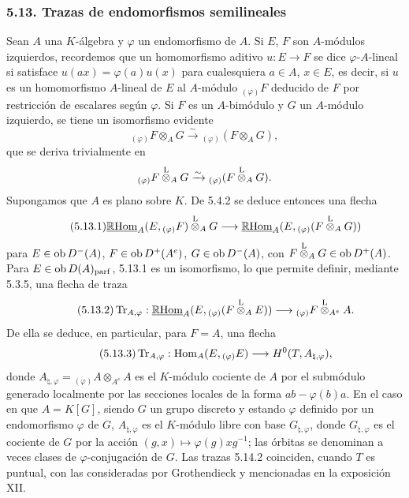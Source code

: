 \subsubsection*{5.13. Trazas de endomorfismos semilineales}

Sean $A$ una $K$-álgebra y $\varphi$ un endomorfismo de $A$. Si $E$, $F$ son $A$-módulos izquierdos, recordemos que un homomorfismo aditivo $u:E\to F$ se dice $\varphi$-$A$-lineal si satisface $u(ax)=\varphi(a)u(x)$ para cualesquiera $a\in A$, $x\in E$, es decir, si $u$ es un homomorfismo $A$-lineal de $E$ al $A$-módulo ${}_{(\varphi)}F$ deducido de $F$ por restricción de escalares según $\varphi$. Si $F$ es un $A$-bimódulo y $G$ un $A$-módulo izquierdo, se tiene un isomorfismo evidente
\[
{}_{(\varphi)}F\otimes_AG\xrightarrow{\sim}{}_{(\varphi)}(F\otimes_AG),
\]
que se deriva trivialmente en
\[
{}_{(\varphi)}F\overset{\mathrm L}{\otimes}_AG\xrightarrow{\sim}{}_{(\varphi)}(F\overset{\mathrm L}{\otimes}_AG).
\]
Supongamos que $A$ es plano sobre $K$. De 5.4.2 se deduce entonces una flecha
\begin{equation}\tag{5.13.1}
\underline{\mathbb{R}\mathrm{Hom}}_A(E,{}_{(\varphi)}F)\overset{\mathrm L}{\otimes}_AG\longrightarrow\underline{\mathbb{R}\mathrm{Hom}}_A(E,{}_{(\varphi)}(F\overset{\mathrm L}{\otimes}_AG))
\end{equation}
para $E\in\operatorname{ob} D^-(A)$, $F\in\operatorname{ob} D^+(A^e)$, $G\in\operatorname{ob} D^-(A)$, con $F\overset{\mathrm L}{\otimes}_AG\in\operatorname{ob} D^+(A)$. Para $E\in\operatorname{ob} D(A)_{\mathrm{parf}}$, 5.13.1 es un isomorfismo, lo que permite definir, mediante 5.3.5, una flecha de traza
\begin{equation}\tag{5.13.2}
\operatorname{Tr}_{A,\varphi}:\underline{\mathbb{R}\mathrm{Hom}}_A(E,{}_{(\varphi)}(F\overset{\mathrm L}{\otimes}_AE))\longrightarrow {}_{(\varphi)}F\overset{\mathrm L}{\otimes}_{A^e}A.
\end{equation}
De ella se deduce, en particular, para $F=A$, una flecha
\begin{equation}\tag{5.13.3}
\operatorname{Tr}_{A,\varphi}:\operatorname{Hom}_A(E,{}_{(\varphi)}E)\longrightarrow H^0(T,A_{\natural,\varphi}),
\end{equation}
donde $A_{\natural,\varphi}={}_{(\varphi)}A\otimes_{A^e}A$ es el $K$-módulo cociente de $A$ por el submódulo generado localmente por las secciones locales de la forma $ab-\varphi(b)a$. En el caso en que $A=K[G]$, siendo $G$ un grupo discreto y estando $\varphi$ definido por un endomorfismo $\varphi$ de $G$, $A_{\natural,\varphi}$ es el $K$-módulo libre con base $G_{\natural,\varphi}$, donde $G_{\natural,\varphi}$ es el cociente de $G$ por la acción $(g,x)\mapsto\varphi(g)xg^{-1}$; las órbitas se denominan a veces clases de $\varphi$-conjugación de $G$. Las trazas 5.14.2 coinciden, cuando $T$ es puntual, con las consideradas por Grothendieck y mencionadas en la exposición XII.
